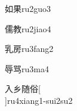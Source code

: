 \begin{verbete}[6;8]{如果}{ru2guo3}
\end{verbete}

\begin{verbete*}[16;11]{儒教}{ru2jiao4}
\end{verbete*}

\begin{verbete}[8;8]{乳房}{ru3fang2}
\end{verbete}

\begin{verbete}[10;9]{辱骂}{ru3ma4}
\end{verbete}

\begin{verbete}[2;3;11;9]{入乡随俗}[\\]{ru4xiang1-sui2su2}
\end{verbete}


